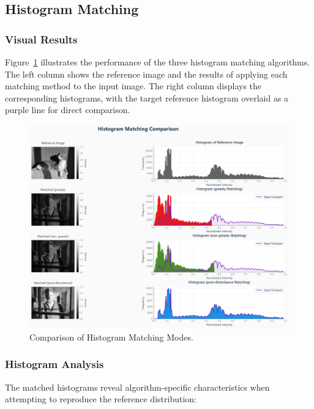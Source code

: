 \documentclass[12pt,a4paper]{article}
\begin{document}
\subsection{Histogram Matching}

\subsubsection{Visual Results}

Figure~\ref{fig:match_comp} illustrates the performance of the three histogram matching algorithms. The left column shows the reference image and the results of applying each matching method to the input image. The right column displays the corresponding histograms, with the target reference histogram overlaid as a purple line for direct comparison.

\begin{figure}[H]
    \centering
    \includegraphics[width=\textwidth]{results/images/histogram_matching_comparison.png}
    \caption{Comparison of Histogram Matching Modes.}
    \label{fig:match_comp}
\end{figure}


\subsubsection{Histogram Analysis}

The matched histograms reveal algorithm-specific characteristics when attempting to reproduce the reference distribution:
\end{document}
